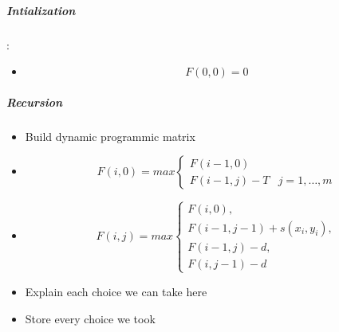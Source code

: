 \subparagraph{Intialization}:
	\begin{itemize}
		\item \[F(0,0) = 0\]
	\end{itemize}

\subparagraph{Recursion}
	\begin{itemize}
		\item Build dynamic programmic matrix
		\item  \[F(i,0) = max \left\{ \begin{array}{lr}F(i-1,0)&\\F(i-1,j)-T& j=1,\dots,m\end{array}\right. \]
		\item  \[F(i,j) = max \left\{ \begin{array}{lr}F(i,0),\\F(i-1,j-1)+s(x_i,y_i),\\F(i-1,j)-d,\\F(i,j-1)-d\end{array}\right.\]
		\item Explain each choice we can take here
		\item Store every choice we took
	\end{itemize}

